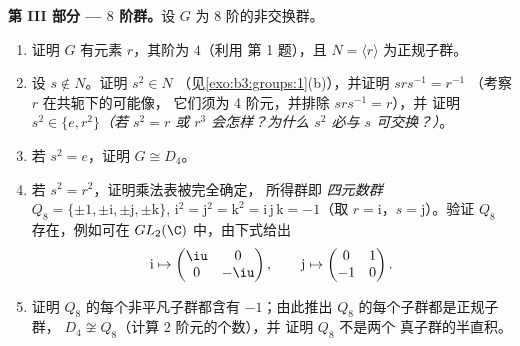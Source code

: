 \begin{problem}
\medskip
\noindent\textbf{第 III 部分 --- $8$ 阶群。}设 $G$ 为
        $8$ 阶的非交换群。
\begin{enumerate}[resume]
  \item 证明 $G$ 有元素 $r$，其阶为 $4$（利用
        第 1 题），且 $N = \langle r\rangle$ 为正规子群。
  \item 设 $s \notin N$。证明 $s^2 \in N$
        （见\cref{exo:b3:groups:1}(b)），并证明 $srs^{-1} = r^{-1}$
        （考察 $r$ 在共轭下的可能像，
        它们须为 4 阶元，并排除 $srs^{-1} = r$），并
        证明 $s^2 \in \{e, r^2\}$\emph{（若 $s^2 = r$
        或 $r^3$ 会怎样？为什么 $s^2$ 必与 $s$ 可交换？）}。
  \item 若 $s^2 = e$，证明 $G \cong D_4$。
  \item 若 $s^2 = r^2$，证明乘法表被完全确定，
        所得群即
        \emph{四元数群} $Q_8 =
        \{\pm 1, \pm \mathrm i, \pm \mathrm j, \pm \mathrm k\}$,
        $\mathrm i^2 = \mathrm j^2 = \mathrm k^2 = \mathrm i\,
        \mathrm j\,\mathrm k = -1$（取 $r = \mathrm i$，$s =
        \mathrm j$）。验证 $Q_8$ 存在，例如可在
        $GL_2(\C)$ 中，由下式给出
        \[
        \mathrm i \mapsto \begin{pmatrix} \iu & 0\\ 0 & -\iu
        \end{pmatrix},
        \qquad
        \mathrm j \mapsto \begin{pmatrix} 0 & 1\\ -1 & 0
        \end{pmatrix}.
        \]
  \item 证明 $Q_8$ 的每个非平凡子群都含有
        $-1$；由此推出 $Q_8$ 的每个子群都是正规子群，
        $D_4 \not\cong Q_8$（计算 $2$ 阶元的个数），并
        证明 $Q_8$ 不是两个
        真子群的半直积。
\end{enumerate}


\end{problem}
